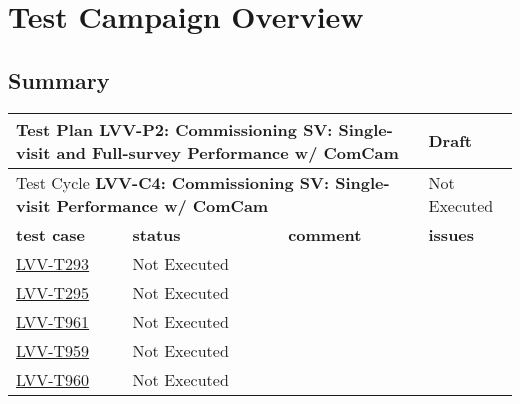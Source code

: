 \documentclass[DM,lsstdraft,STR,toc]{lsstdoc}
\begin{document}
\newpage

\section{Test Campaign Overview}
\label{sect:overview}

\subsection{Summary}
\label{sect:summarytable}

\begin{longtable}{p{2cm}p{2.5cm}p{9cm}p{2.5cm}}
\toprule
\multicolumn{3}{l}{ Test Plan {\bf LVV-P2: Commissioning SV: Single-visit and Full-survey Performance w/ ComCam
 }} & Draft \\\hline

  \multicolumn{3}{l}{ Test Cycle {\bf LVV-C4: Commissioning SV: Single-visit Performance w/ ComCam
 }} & Not Executed \\\hline

  {\bf \footnotesize test case} & {\bf \footnotesize status} & {\bf \footnotesize comment} & {\bf \footnotesize issues} \\\toprule

\href{https://jira.lsstcorp.org/secure/Tests.jspa#/testCase/LVV-T293}{LVV-T293}
    & Not Executed &
    \begin{minipage}[]{9cm}
    \smallskip
    
    \medskip
    \end{minipage}
    &
    \\\hline
\href{https://jira.lsstcorp.org/secure/Tests.jspa#/testCase/LVV-T295}{LVV-T295}
    & Not Executed &
    \begin{minipage}[]{9cm}
    \smallskip
    
    \medskip
    \end{minipage}
    &
    \\\hline
\href{https://jira.lsstcorp.org/secure/Tests.jspa#/testCase/LVV-T961}{LVV-T961}
    & Not Executed &
    \begin{minipage}[]{9cm}
    \smallskip
    
    \medskip
    \end{minipage}
    &
    \\\hline
\href{https://jira.lsstcorp.org/secure/Tests.jspa#/testCase/LVV-T959}{LVV-T959}
    & Not Executed &
    \begin{minipage}[]{9cm}
    \smallskip
    
    \medskip
    \end{minipage}
    &
    \\\hline
\href{https://jira.lsstcorp.org/secure/Tests.jspa#/testCase/LVV-T960}{LVV-T960}
    & Not Executed &
    \begin{minipage}[]{9cm}
    \smallskip
    

\end{minipage}
\end{longtable}
\end{document}
